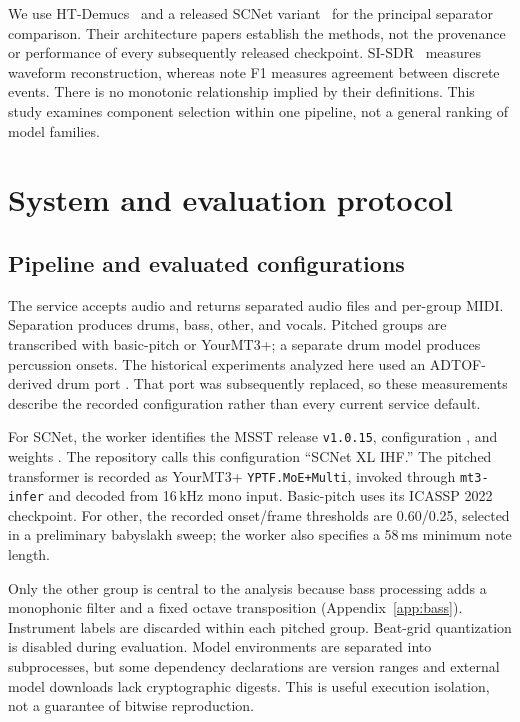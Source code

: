 \documentclass[11pt]{article}
\begin{document}
We use HT-Demucs~\citep{rouard2023hybrid} and a released SCNet
variant~\citep{tong2024scnet} for the principal separator comparison. Their
architecture papers establish the methods, not the provenance or performance of
every subsequently released checkpoint. SI-SDR~\citep{leroux2019sdr} measures
waveform reconstruction, whereas note F1 measures agreement between discrete events.
There is no monotonic relationship implied by their definitions. This study
examines component selection within one pipeline, not a general ranking of model
families.

\section{System and evaluation protocol}
\label{sec:protocol}
\subsection{Pipeline and evaluated configurations}
The service accepts audio and returns separated audio files and per-group MIDI.
Separation produces drums, bass, other, and vocals. Pitched groups are transcribed
with basic-pitch or YourMT3+; a separate drum model produces percussion onsets.
The historical experiments analyzed here used an ADTOF-derived drum port
\citep{zehren2021adtof}. That port was subsequently replaced, so these measurements
describe the recorded configuration rather than every current service default.

For SCNet, the worker identifies the MSST release \texttt{v1.0.15}, configuration
, and weights
. The repository calls this
configuration ``SCNet XL IHF.'' The pitched transformer is recorded as
YourMT3+ \texttt{YPTF.MoE+Multi}, invoked through \texttt{mt3-infer} and decoded
from 16\,kHz mono input. Basic-pitch uses its ICASSP 2022 checkpoint. For other,
the recorded onset/frame thresholds are 0.60/0.25, selected in a preliminary
babyslakh sweep; the worker also specifies a 58\,ms minimum note length.

Only the other group is central to the analysis because bass processing adds a
monophonic filter and a fixed octave transposition (Appendix~\ref{app:bass}).
Instrument labels are discarded within each pitched group. Beat-grid quantization
is disabled during evaluation. Model environments are separated into subprocesses,
but some dependency declarations are version ranges and external model downloads
lack cryptographic digests. This is useful execution isolation, not a guarantee
of bitwise reproduction.
\end{document}
